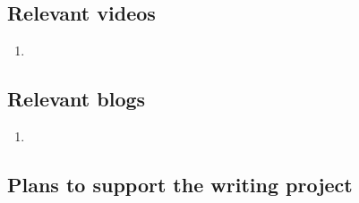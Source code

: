 \documentclass[10pt,letterpaper]{article}
\newcommand{\be}{\begin{enumerate}}
\newcommand{\ee}{\end{enumerate}}
\begin{document}
\subsection*{Relevant videos}

\be
\item 
\ee

\subsection*{Relevant blogs}

\be
\item 
\ee

\subsection*{Plans to support the writing project}

\end{document}
